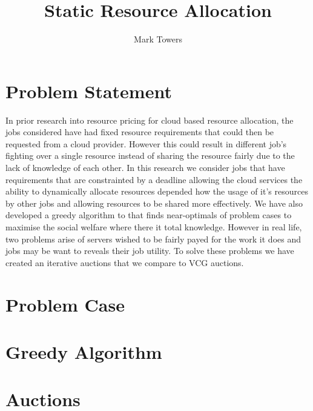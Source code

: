 \documentclass[fleqn]{article}
\title{Static Resource Allocation}
\author{Mark Towers}
\date
\begin{document}
\maketitle

\section{Problem Statement}\label{sec:problem-statement}
In prior research into resource pricing for cloud based resource allocation, the jobs considered have had
fixed resource requirements that could then be requested from a cloud provider. However this could result in
different job's fighting over a single resource instead of sharing the resource fairly due to the lack of knowledge of each other.
In this research we consider jobs that have requirements that are constrainted by a deadline allowing the
cloud services the ability to dynamically allocate resources depended how the usage of it's resources by other jobs
and allowing resources to be shared more effectively. We have also developed a greedy algorithm to that finds near-optimals
of problem cases to maximise the social welfare where there it total knowledge. However in real life, two problems arise of
servers wished to be fairly payed for the work it does and jobs may be want to reveals their job utility.
To solve these problems we have created an iterative auctions that we compare to VCG auctions.

\section{Problem Case}\label{sec:problem-case}


\section{Greedy Algorithm}\label{sec:greedy-algorithm}


\section{Auctions}\label{sec:auctions-idea}

\end{document}
